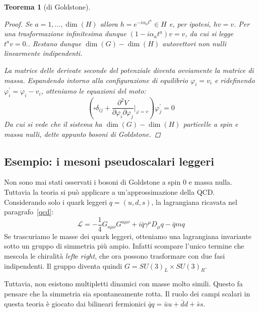 \documentclass[italian,a4paper]{article}
\newtheorem*{theorem}{Teorema}
\theoremstyle{definition}
\newcommand{\lagr}{\ensuremath{\mathscr{L}}}
\newcommand{\Dimu}{\ensuremath{D_{\mu}}}
\begin{document}
\begin{theorem}[di Goldstone]
\begin{proof}
        Se $a = 1,\ldots, \dim(H)$ allora $h = e^{-i \alpha_a t^a} \in H$ e,
        per ipotesi, $hv = v$. Per una trasformazione infinitesima dunque
        $(1 - i\alpha_a t^a) v = v$, da cui si legge $t^a v = 0.$.
        Restano dunque $\dim(G) - \dim(H)$ autovettori non nulli linearmente
        indipendenti.

        La matrice delle derivate seconde del potenziale diventa ovviamente
        la matrice di massa. Espandendo intorno alla configurazione di
        equilibrio $\varphi_i = v_i$ e ridefinendo $\varphi_i^\prime = \varphi_i -
        v_i$, otteniamo le equazioni del moto:
        \begin{equation*}
            \left( \square \delta_{ij} + \dfrac{\partial^2 V}{\partial
            \varphi_i \partial \varphi_j}|_{\varphi = v} \right) \varphi^\prime_j
            = 0
        \end{equation*}
        Da cui si vede che il sistema ha $\dim(G) - \dim(H)$ particelle a
        spin e massa nulli, dette appunto bosoni di Goldstone.
    \end{proof}
\end{theorem}
\subsection*{Esempio: i mesoni pseudoscalari leggeri}
Non sono mai stati osservati i bosoni di Goldstone a spin $0$ e massa nulla.
Tuttavia la teoria si pu\`o applicare a un'approssimazione della QCD.
Considerando solo i quark leggeri $q = (u, d, s)$, la lagrangiana ricavata nel paragrafo~\ref{qcd}:
    \begin{equation*}
        \lagr = - \dfrac{1}{4}G_{a\mu\nu}G^{a\mu\nu} + i \bar q
        \gamma^\mu\Dimu q - \bar q m q
    \end{equation*}
Se trascuriamo le masse dei quark leggeri, otteniamo una lagrangiana
invariante sotto un gruppo di simmetria pi\`u ampio. Infatti scompare
l'unico termine che mescola le chiralit\`a \emph{left}e \emph{right}, che
ora possono trasformare con due fasi indipendenti. Il gruppo diventa quindi
$G = SU(3)_L \times SU(3)_R$.

Tuttavia, non esistono multipletti dinamici con masse molto simili. Questo
fa pensare che la simmetria sia spontaneamente rotta. Il ruolo dei campi
scalari in questa teoria \`e giocato dai bilineari fermionici $\bar q q = \bar u u +
\bar d d + \bar s s$.
\end{document}
